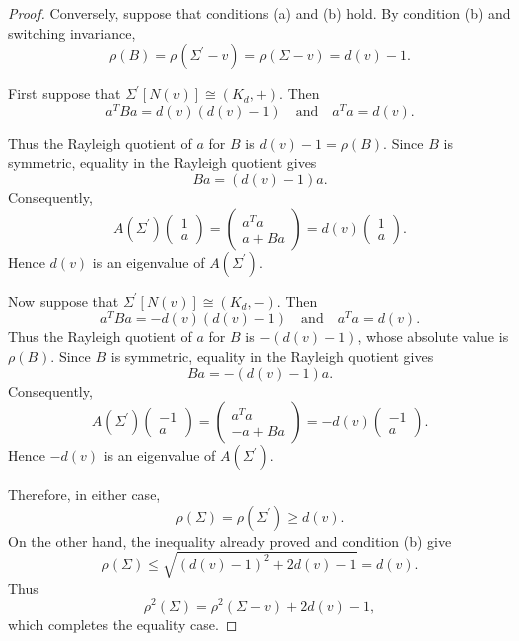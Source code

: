 \documentclass[10pt,a4paper]{amsart}
\begin{document}
\begin{proof}
		Conversely, suppose that conditions (a) and (b) hold. By condition (b) and switching invariance,
		\[ \rho(B)=\rho(\Sigma^\prime-v)=\rho(\Sigma-v)=d(v)-1. \]
		
		First suppose that $\Sigma^\prime[N(v)]\cong(K_d,+)$. Then
		\[ a^TBa=d(v)(d(v)-1) \quad\text{and}\quad a^Ta=d(v). \]
		
		Thus the Rayleigh quotient of $a$ for $B$ is $d(v)-1=\rho(B)$. Since $B$ is symmetric, equality in the Rayleigh quotient gives
		\[ Ba=(d(v)-1)a. \]
		Consequently,
		\[ 
		A(\Sigma^\prime)
		\begin{pmatrix}
			1\\
			a
		\end{pmatrix}
		=
		\begin{pmatrix}
			a^Ta\\
			a+Ba
		\end{pmatrix}
		=d(v)
		\begin{pmatrix}
			1\\
			a
		\end{pmatrix}. \]
		Hence $d(v)$ is an eigenvalue of $A(\Sigma^\prime)$.
		
		Now suppose that $\Sigma^\prime[N(v)]\cong(K_d,-)$. Then
		\[ a^TBa=-d(v)(d(v)-1) \quad\text{and}\quad a^Ta=d(v). \]
		Thus the Rayleigh quotient of $a$ for $B$ is $-(d(v)-1)$, whose absolute value is $\rho(B)$. Since $B$ is symmetric, equality in the Rayleigh quotient gives
		\[ Ba=-(d(v)-1)a. \]
		Consequently,
		\[
		A(\Sigma^\prime)
		\begin{pmatrix}
			-1\\
			a
		\end{pmatrix}
		=
		\begin{pmatrix}
			a^Ta\\
			-a+Ba
		\end{pmatrix}
		=-d(v)
		\begin{pmatrix}
			-1\\
			a
		\end{pmatrix}.\]
		Hence $-d(v)$ is an eigenvalue of $A(\Sigma^\prime)$.
		
		Therefore, in either case,
		\[ \rho(\Sigma)=\rho(\Sigma^\prime)\geq d(v). \]
		On the other hand, the inequality already proved and condition (b) give
		\[ \rho(\Sigma) \leq \sqrt{(d(v)-1)^2+2d(v)-1} =d(v).\]
		Thus
		\[\rho^2(\Sigma)=\rho^2(\Sigma-v)+2d(v)-1,\]
		which completes the equality case.
	\end{proof}
\end{document}
